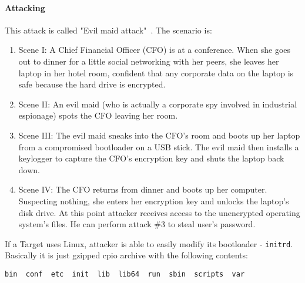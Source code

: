 \paragraph*{Attacking}
This attack is called "Evil maid attack"~\cite{evil-maid}. The scenario is:
\begin{enumerate}
    \item Scene I:  A Chief Financial Officer (CFO) is at a conference. When she goes out to dinner for a little social networking with her peers, she leaves her laptop in her hotel room, confident that any corporate data on the laptop is safe because the hard drive is encrypted.

    \item Scene II: An evil maid (who is actually a corporate spy involved in industrial espionage) spots the CFO leaving her room.

    \item Scene III: The evil maid sneaks into the CFO's room and boots up her laptop from a compromised bootloader on a USB stick.  The evil maid then installs a keylogger to capture the CFO's encryption key and shuts the laptop back down. 

    \item Scene IV: The CFO returns from dinner and boots up her computer. Suspecting nothing, she enters her encryption key and unlocks the laptop's disk drive. At this point attacker receives access to the unencrypted operating system's files. He can perform attack \#3 to steal user's password.
\end{enumerate}

If a Target uses Linux, attacker is able to easily modify its bootloader - \texttt{initrd}. Basically it is just gzipped cpio archive with the following contents:
\begin{lstlisting}
bin  conf  etc  init  lib  lib64  run  sbin  scripts  var
\end{lstlisting}

